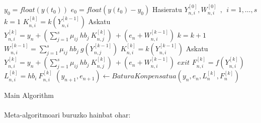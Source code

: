 \begin{algorithm}[H]
 \BlankLine
  $y_0=float(y(t_0))$\;
  $e_0=float(y(t_0)-y_0)$\;
  \BlankLine
  {
   \BlankLine
    Hasieratu  $Y_{n,i}^{[0]},W_{n,i}^{[0]} \ \ , \ \ i=1,\dots,s $\;  
    $k=1 $\;
    $K_{n,i}^{[k]}=k(Y_{n,i}^{[k-1]}) $\;
    Askatu $Y_{n,i}^{[k]}=y_{n}+ \left(\sum\limits_{j=1}^{s} \mu_{ij} \ hb_j \ K_{n,j}^{[k]} \right) \ + (e_{n}+ W_{n,i}^{[k-1]}) $\;
   \BlankLine
   {
    \BlankLine 
    $k=k+1$\;
    $W_{n,i}^{[k-1]}=\sum\limits_{j=1}^{s} \mu_{ij} \ hb_j \ g(Y_{n,j}^{[k-1]}) $\;  
    $K_{n,i}^{[k]}=k(Y_{n,i}^{[k-1]}) $\;
    Askatu $Y_{n,i}^{[k]}=y_{n}+ \left(\sum\limits_{j=1}^{s} \mu_{ij} \ hb_j \ K_{n,j}^{[k]} \right) \ + ( e_{n}+ W_{n,i}^{[k-1]}) $\;
   }
   \BlankLine
   {$exit$\;}
   {$F_{n,i}^{[k]}=f(Y_{n,i}^{[k]}) $\;
    $L_{n,i}^{[k]}=hb_i \ F_{n,i}^{[k]} $\;
    $(y_{n+1},e_{n+1})\leftarrow BaturaKonpensatua(y_n,e_n,L_n^{[k]},F_n^{[k]})$\;}    
   \BlankLine
   \BlankLine
 }
 \caption{Main Algorithm}
\end{algorithm}

\paragraph*{} Meta-algoritmoari buruzko hainbat ohar:


